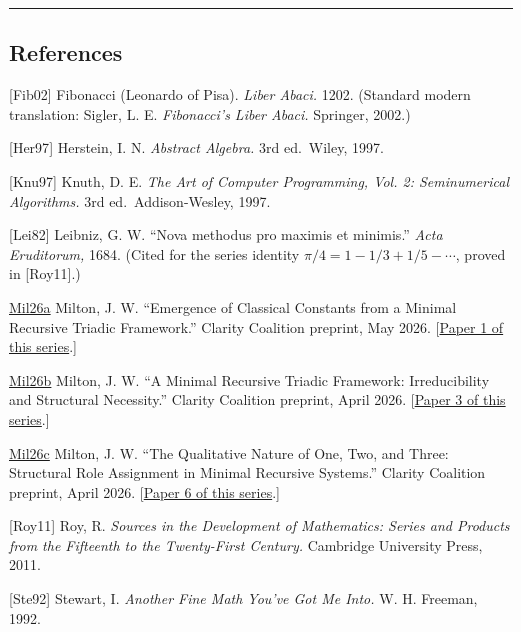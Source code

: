 \documentclass[
  11pt,
  letterpaper,
]{article}
\begin{document}
\begin{center}\rule{0.5\linewidth}{0.5pt}\end{center}

\subsection{References}\label{references}

{[}Fib02{]} Fibonacci (Leonardo of Pisa). \emph{Liber Abaci.} 1202.
(Standard modern translation: Sigler, L. E. \emph{Fibonacci's Liber
Abaci.} Springer, 2002.)

{[}Her97{]} Herstein, I. N. \emph{Abstract Algebra.} 3rd ed.~Wiley,
1997.

{[}Knu97{]} Knuth, D. E. \emph{The Art of Computer Programming, Vol. 2:
Seminumerical Algorithms.} 3rd ed.~Addison-Wesley, 1997.

{[}Lei82{]} Leibniz, G. W. ``Nova methodus pro maximis et minimis.''
\emph{Acta Eruditorum,} 1684. (Cited for the series identity
\(\pi/4 = 1 - 1/3 + 1/5 - \cdots\), proved in {[}Roy11{]}.)

\href{https://github.com/baardev/truevalue/blob/main/docnav/Research/papers/1_recursive-tholonic-five-constants/1_recursive-tholonic-five-constants.pdf}{Mil26a}
Milton, J. W. ``Emergence of Classical Constants from a Minimal
Recursive Triadic Framework.'' Clarity Coalition preprint, May 2026.
{[}\href{https://github.com/baardev/truevalue/blob/main/docnav/Research/papers/1_recursive-tholonic-five-constants/1_recursive-tholonic-five-constants.pdf}{Paper
1 of this series}.{]}

\href{https://github.com/baardev/truevalue/blob/main/docnav/Research/papers/3_minimal-recursive-triadic-framework/3_minimal-recursive-triadic-framework.pdf}{Mil26b}
Milton, J. W. ``A Minimal Recursive Triadic Framework: Irreducibility
and Structural Necessity.'' Clarity Coalition preprint, April 2026.
{[}\href{https://github.com/baardev/truevalue/blob/main/docnav/Research/papers/3_minimal-recursive-triadic-framework/3_minimal-recursive-triadic-framework.pdf}{Paper
3 of this series}.{]}

\href{https://github.com/baardev/truevalue/blob/main/docnav/Research/papers/6_qualitative-nature-integers-triadic-roles/6_qualitative-nature-integers-triadic-roles.pdf}{Mil26c}
Milton, J. W. ``The Qualitative Nature of One, Two, and Three:
Structural Role Assignment in Minimal Recursive Systems.'' Clarity
Coalition preprint, April 2026.
{[}\href{https://github.com/baardev/truevalue/blob/main/docnav/Research/papers/6_qualitative-nature-integers-triadic-roles/6_qualitative-nature-integers-triadic-roles.pdf}{Paper
6 of this series}.{]}

{[}Roy11{]} Roy, R. \emph{Sources in the Development of Mathematics:
Series and Products from the Fifteenth to the Twenty-First Century.}
Cambridge University Press, 2011.

{[}Ste92{]} Stewart, I. \emph{Another Fine Math You've Got Me Into.} W.
H. Freeman, 1992.
\end{document}
